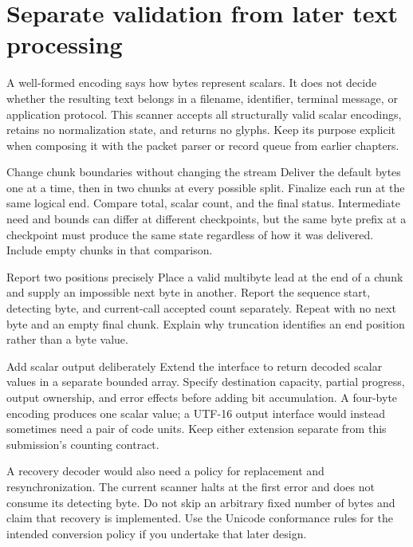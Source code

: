 \section{Separate validation from later text processing}
A well-formed encoding says how bytes represent scalars. It does not decide whether
the resulting text belongs in a filename, identifier, terminal message, or application
protocol. This scanner accepts all structurally valid scalar encodings, retains no
normalization state, and returns no glyphs. Keep its purpose explicit when composing
it with the packet parser or record queue from earlier chapters.

\begin{MARSExercise}{Change chunk boundaries without changing the stream}
  Deliver the default bytes one at a time, then in two chunks at every possible split.
  Finalize each run at the same logical end. Compare total, scalar count, and the final
  status. Intermediate need and bounds can differ at different checkpoints, but the
  same byte prefix at a checkpoint must produce the same state regardless of how it
  was delivered. Include empty chunks in that comparison.
\end{MARSExercise}

\begin{MARSExercise}{Report two positions precisely}
  Place a valid multibyte lead at the end of a chunk and supply an impossible next
  byte in another. Report the sequence start, detecting byte, and current-call
  accepted count separately. Repeat with no next byte and an empty final chunk.
  Explain why truncation identifies an end position rather than a byte value.
\end{MARSExercise}

\begin{MARSExercise}{Add scalar output deliberately}
  Extend the interface to return decoded scalar values in a separate bounded array.
  Specify destination capacity, partial progress, output ownership, and error effects
  before adding bit accumulation. A four-byte encoding produces one scalar value;
  a UTF-16 output interface would instead sometimes need a pair of code units.
  Keep either extension separate from this submission's counting contract.
\end{MARSExercise}

A recovery decoder would also need a policy for replacement and resynchronization.
The current scanner halts at the first error and does not consume its detecting
byte. Do not skip an arbitrary fixed number of bytes and claim that recovery is
implemented. Use the Unicode conformance rules for the intended conversion policy
if you undertake that later design.
